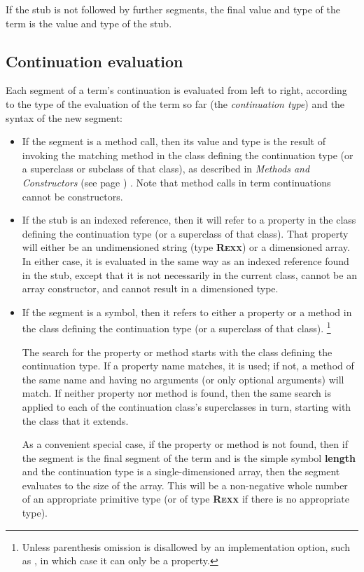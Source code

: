 If the stub is not followed by further segments, the final value and
type of the term is the value and type of the stub.
\subsection{Continuation evaluation}
 
Each segment of a term's continuation is evaluated from left to right,
according to the type of the evaluation of the term so far (the
\emph{continuation type}) and the syntax of the new segment:
\begin{itemize}
\item 
If the segment is a method call, then its value and type is the result
of invoking the matching method in the class defining the continuation
type (or a superclass or subclass of that class), as described in
 \emph{Methods and Constructors} (see page \pageref{refmethcon}) .
Note that method calls in term continuations cannot be constructors.
\item 
If the stub is an indexed reference, then it will refer to a property
in the class defining the continuation type (or a superclass of that
class).
That property will either be an undimensioned \nr{} string
(type \textbf{R\textsc{exx}}) or a dimensioned array.  In either case, it is
evaluated in the same way as an indexed reference found in the stub,
except that it is not necessarily in the current class, cannot
be an array constructor, and cannot result in a dimensioned type.
\item 
If the segment is a symbol, then it refers to either a property
or a method in the class defining the continuation type (or a superclass
of that class).
\footnote{
Unless parenthesis omission is disallowed by an implementation option,
such as , in which case it can only be a
property.
}
 
The search for the property or method starts with the class defining the
continuation type.  If a property name matches, it is used; if not, a
method of the same name and having no arguments (or only optional
arguments) will match.
If neither property nor method is found, then the same search is applied
to each of the continuation class's superclasses in turn, starting with
the class that it extends.
 
As a convenient special case, if the property or method is not found,
then if the segment is the final segment of the term and is the simple
symbol \textbf{length} and the continuation type is a
single-dimensioned array, then the segment evaluates to the size of the
array.
This will be a non-negative whole number of an appropriate primitive
type (or of type \textbf{R\textsc{exx}} if there is no appropriate
type).
\end{itemize}
 
